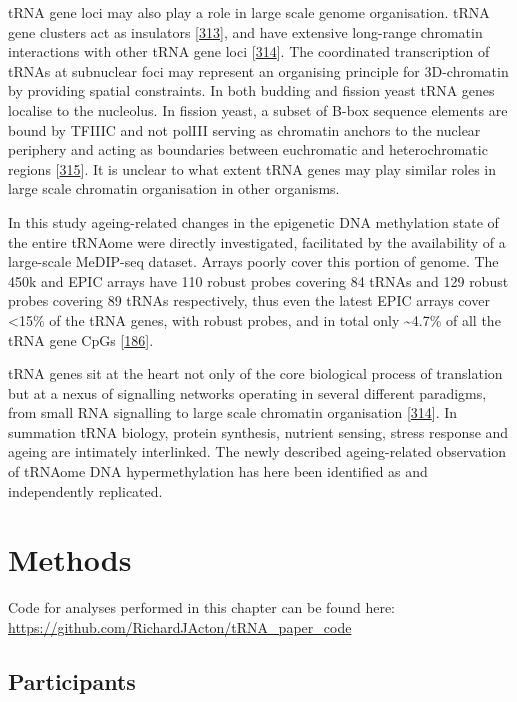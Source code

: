 \documentclass[
]{book}
\begin{document}
tRNA gene loci may also play a role in large scale genome organisation.
tRNA gene clusters act as insulators {[}\protect\hyperlink{ref-Raab2011}{313}{]}, and have extensive long-range chromatin interactions with other tRNA gene loci {[}\protect\hyperlink{ref-VanBortle2017}{314}{]}.
The coordinated transcription of tRNAs at subnuclear foci may represent an organising principle for 3D-chromatin by providing spatial constraints.
In both budding and fission yeast tRNA genes localise to the nucleolus.
In fission yeast, a subset of B-box sequence elements are bound by TFIIIC and not polIII serving as chromatin anchors to the nuclear periphery and acting as boundaries between euchromatic and heterochromatic regions {[}\protect\hyperlink{ref-Noma2006}{315}{]}.
It is unclear to what extent tRNA genes may play similar roles in large scale chromatin organisation in other organisms.

In this study ageing-related changes in the epigenetic DNA methylation state of the entire tRNAome were directly investigated, facilitated by the availability of a large-scale MeDIP-seq dataset.
Arrays poorly cover this portion of genome.
The 450k and EPIC arrays have 110 robust probes covering 84 tRNAs and 129 robust probes covering 89 tRNAs respectively, thus even the latest EPIC arrays cover \textless15\% of the tRNA genes, with robust probes, and in total only \textasciitilde4.7\% of all the tRNA gene CpGs {[}\protect\hyperlink{ref-Zhou2017}{186}{]}.

tRNA genes sit at the heart not only of the core biological process of translation but at a nexus of signalling networks operating in several different paradigms, from small RNA signalling to large scale chromatin organisation {[}\protect\hyperlink{ref-VanBortle2017}{314}{]}.
In summation tRNA biology, protein synthesis, nutrient sensing, stress response and ageing are intimately interlinked.
The newly described ageing-related observation of tRNAome DNA hypermethylation has here been identified as and independently replicated.

\newpage

\hypertarget{tRNAmethods}{%
\section{Methods}\label{tRNAmethods}}

Code for analyses performed in this chapter can be found here: \url{https://github.com/RichardJActon/tRNA_paper_code}

\hypertarget{tRNA-Participants}{%
\subsection{Participants}\label{tRNA-Participants}}
\end{document}
